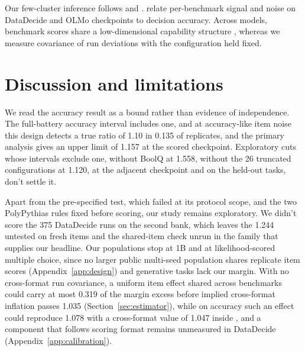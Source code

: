 Our few-cluster inference follows \citet{cameron2008} and \citet{mackinnon2017}. \citet{heineman2025} relate per-benchmark signal and noise on DataDecide and OLMo checkpoints to decision accuracy. Across models, benchmark scores share a low-dimensional capability structure \citep{ruan2024,burnell2023revealing}, whereas we measure covariance of run deviations with the configuration held fixed.

\section{Discussion and limitations}
We read the accuracy result as a bound rather than evidence of independence. The full-battery accuracy interval includes one, and at accuracy-like item noise this design detects a true ratio of 1.10 in 0.135 of replicates, and the primary analysis gives an upper limit of 1.157 at the scored checkpoint. Exploratory cuts whose intervals exclude one, without BoolQ at 1.558, without the 26 truncated configurations at 1.120, at the adjacent checkpoint and on the held-out tasks, don't settle it.

Apart from the pre-specified test, which failed at its protocol scope, and the two PolyPythias rules fixed before scoring, our study remains exploratory. We didn't score the 375 DataDecide runs on the second bank, which leaves the 1.244 untested on fresh items and the shared-item check unrun in the family that supplies our headline. Our populations stop at 1B and at likelihood-scored multiple choice, since no larger public multi-seed population shares replicate item scores (Appendix~\ref{app:design}) and generative tasks lack our margin. With no cross-format run covariance, a uniform item effect shared across benchmarks could carry at most 0.319 of the margin excess before implied cross-format inflation passes 1.035 (Section~\ref{sec:estimator}), while on accuracy such an effect could reproduce 1.078 with a cross-format value of 1.047 inside , and a component that follows scoring format remains unmeasured in DataDecide (Appendix~\ref{app:calibration}).

